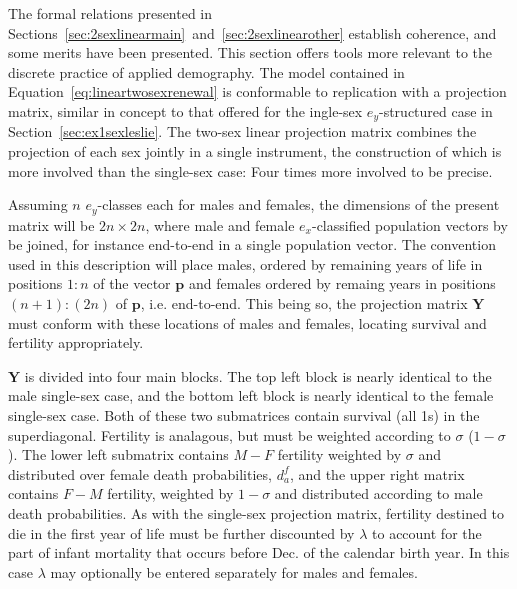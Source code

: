 \FloatBarrier
The formal relations presented in
Sections~\ref{sec:2sexlinearmain}~and~\ref{sec:2sexlinearother} establish
coherence, and some merits have been presented. This section offers tools
more relevant to the discrete practice of applied demography. The model
contained in Equation~\ref{eq:lineartwosexrenewal} is conformable to replication 
with a projection matrix, similar in concept to that offered for the 
ingle-sex $e_y$-structured
case in Section~\ref{sec:ex1sexleslie}. The two-sex linear projection matrix combines
the projection of each sex jointly in a single instrument, the construction of 
which is more involved than the single-sex case: Four times more involved to be precise. 

Assuming $n$ $e_y$-classes each for males and females, the dimensions of the
present matrix will be $2n \times 2n$, where male and female
$e_x$-classified population vectors by be joined, for instance end-to-end in a
single population vector. The convention used in this description will place
males, ordered by remaining years of life in positions $1:n$ of the vector
$\textbf{p}$ and females ordered by remaing years in positions $(n+1):(2n)$ of
$\textbf{p}$, i.e. end-to-end. This being so, the projection matrix $\textbf{Y}$
must conform with these locations of males and females, locating survival and 
fertility appropriately.

$\textbf{Y}$ is divided into four main blocks. The top left block is
nearly identical to the male single-sex case, and the bottom left block is
nearly identical to the female single-sex case. Both of these two submatrices
contain survival (all 1s) in the superdiagonal. Fertility is analagous, but must
be weighted according to $\sigma$ ($1-\sigma$). The lower left submatrix
contains $M-F$ fertility weighted by $\sigma$ and distributed over female death probabilities,
$d_a^f$, and the upper right matrix contains $F-M$ fertility, weighted by
$1-\sigma$ and distributed according to male death probabilities. As with the
single-sex projection matrix, fertility destined to die in the first year of
life must be further discounted by $\lambda$ to account for the part of infant
mortality that occurs before Dec.  of the calendar birth year. In this
case $\lambda$ may optionally be entered separately for males and females.

